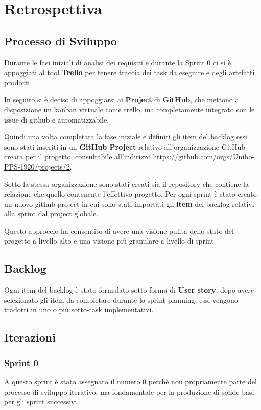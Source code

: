 \chapter{Retrospettiva}

\section{Processo di Sviluppo}
Durante le fasi iniziali di analisi dei requisiti e durante la Sprint 0 ci si è appoggiati al tool \textbf{Trello} per tenere traccia dei task da eseguire e degli artefatti prodotti.

In seguito si è deciso di appoggiarsi ai \textbf{Project} di \textbf{GitHub}, che mettono a disposizione un kanban virtuale come trello, ma completamente integrato con le issue di github e automatizzabile.


Quindi una volta completata la fase iniziale e definiti gli item del backlog essi sono stati inseriti in un \textbf{GitHub Project} relativo all'organizzazione GitHub creata per il progetto, consultabile all'indirizzo \url{https://github.com/orgs/Unibo-PPS-1920/projects/2}.

Sotto la stessa organizzazione sono stati creati sia il repository che contiene la relazione che quello contenente l'effettivo progetto.
Per ogni sprint è stato creato un nuovo github project in cui sono stati importati gli \textbf{item} del backlog relativi alla sprint dal project globale.

Questo approccio ha consentito di avere una visione pulita dello stato del progetto a livello alto e una visione più granulare a livello di sprint.

\section{Backlog}
Ogni item del backlog è stato formulato sotto forma di \textbf{User story}, dopo avere selezionato gli item da completare durante lo sprint planning, essi vengono tradotti in uno o più sotto-task implementativi.

\section{Iterazioni}
\subsection{Sprint 0}
A questo sprint è stato assegnato il numero 0 perchè non propriamente parte del processo di sviluppo iterativo, ma fondamentale per la produzione di solide basi per gli sprint successivi.
